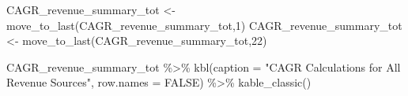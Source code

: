 \documentclass[
  letterpaper,
  DIV=11,
  numbers=noendperiod]{scrreport}
\newenvironment{Shaded}{\begin{snugshade}}{\end{snugshade}}
\newcommand{\AttributeTok}[1]{\textcolor[rgb]{0.40,0.45,0.13}{#1}}
\newcommand{\ConstantTok}[1]{\textcolor[rgb]{0.56,0.35,0.01}{#1}}
\newcommand{\DecValTok}[1]{\textcolor[rgb]{0.68,0.00,0.00}{#1}}
\newcommand{\FunctionTok}[1]{\textcolor[rgb]{0.28,0.35,0.67}{#1}}
\newcommand{\NormalTok}[1]{\textcolor[rgb]{0.00,0.23,0.31}{#1}}
\newcommand{\OtherTok}[1]{\textcolor[rgb]{0.00,0.23,0.31}{#1}}
\newcommand{\SpecialCharTok}[1]{\textcolor[rgb]{0.37,0.37,0.37}{#1}}
\newcommand{\StringTok}[1]{\textcolor[rgb]{0.13,0.47,0.30}{#1}}
\begin{document}
\begin{Shaded}
\begin{Highlighting}[]
\NormalTok{CAGR\_revenue\_summary\_tot }\OtherTok{\textless{}{-}} \FunctionTok{move\_to\_last}\NormalTok{(CAGR\_revenue\_summary\_tot,}\DecValTok{1}\NormalTok{)}
\NormalTok{CAGR\_revenue\_summary\_tot }\OtherTok{\textless{}{-}} \FunctionTok{move\_to\_last}\NormalTok{(CAGR\_revenue\_summary\_tot,}\DecValTok{22}\NormalTok{)}

\NormalTok{CAGR\_revenue\_summary\_tot }\SpecialCharTok{\%\textgreater{}\%} 
  \FunctionTok{kbl}\NormalTok{(}\AttributeTok{caption =} \StringTok{"CAGR Calculations for All Revenue Sources"}\NormalTok{, }\AttributeTok{row.names =} \ConstantTok{FALSE}\NormalTok{) }\SpecialCharTok{\%\textgreater{}\%} 
     \FunctionTok{kable\_classic}\NormalTok{() }
\end{Highlighting}
\end{Shaded}
\end{document}
